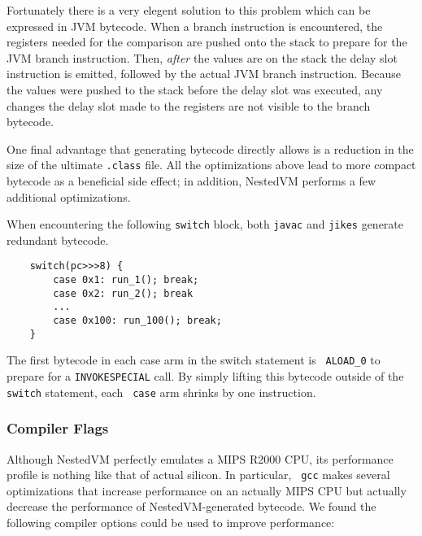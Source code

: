 \documentclass{acmconf}
\begin{document}
Fortunately there is a very elegent solution to this problem which can
be expressed in JVM bytecode.  When a branch instruction is
encountered, the registers needed for the comparison are pushed onto
the stack to prepare for the JVM branch instruction.  Then, {\it
after} the values are on the stack the delay slot instruction is
emitted, followed by the actual JVM branch instruction.  Because the
values were pushed to the stack before the delay slot was executed, any
changes the delay slot made to the registers are not visible to the
branch bytecode.

One final advantage that generating bytecode directly allows is a
reduction in the size of the ultimate {\tt .class} file.  All the
optimizations above lead to more compact bytecode as a beneficial side
effect; in addition, NestedVM performs a few additional optimizations.

When encountering the following {\tt switch} block, both {\tt javac}
and {\tt jikes} generate redundant bytecode.

{\footnotesize\begin{verbatim}
    switch(pc>>>8) {
        case 0x1: run_1(); break;
        case 0x2: run_2(); break
        ...
        case 0x100: run_100(); break;
    }
\end{verbatim}}

The first bytecode in each case arm in the switch statement is {\tt
ALOAD\_0} to prepare for a {\tt INVOKESPECIAL} call.  By simply
lifting this bytecode outside of the {\tt switch} statement, each {\tt
case} arm shrinks by one instruction.

\subsubsection{Compiler Flags}

Although NestedVM perfectly emulates a MIPS R2000 CPU, its performance
profile is nothing like that of actual silicon.  In particular, {\tt
gcc} makes several optimizations that increase performance on an
actually MIPS CPU but actually decrease the performance of
NestedVM-generated bytecode.  We found the following compiler options
could be used to improve performance:
\end{document}
